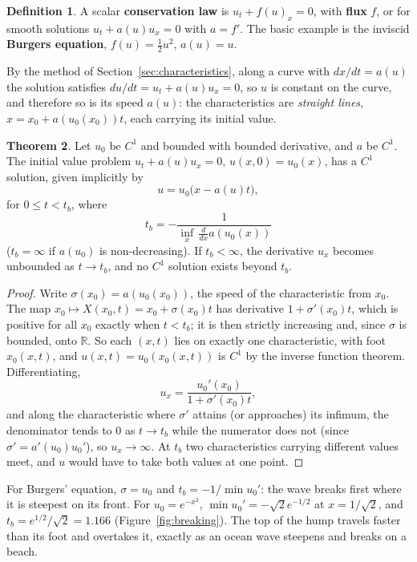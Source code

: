 \documentclass[11pt,a4paper]{article}
\numberwithin{equation}{section}
\theoremstyle{definition}
\newtheorem{thm}{Theorem}[subsection]
\newtheorem{defn}[thm]{Definition}
\begin{document}
\begin{defn}
A scalar \textbf{conservation law} is $u_t + f(u)_x = 0$, with \textbf{flux} $f$, or for smooth solutions $u_t + a(u)u_x = 0$ with $a = f'$. The basic example is the inviscid \textbf{Burgers equation},
$f(u) = \frac12u^2$, $a(u) = u$.
\end{defn}

By the method of Section~\ref{sec:characteristics}, along a curve with $dx/dt = a(u)$ the solution satisfies $du/dt = u_t + a(u)u_x = 0$, so $u$ is constant on the curve, and therefore so is its speed $a(u)$: the
characteristics are \emph{straight lines}, $x = x_0 + a(u_0(x_0))t$, each carrying its initial value.

\begin{thm}
\label{thm:breaking}
Let $u_0$ be $C^1$ and bounded with bounded derivative, and $a$ be $C^1$. The initial value problem $u_t + a(u)u_x = 0$, $u(x, 0) = u_0(x)$, has a $C^1$ solution, given implicitly by
\[
u = u_0\bigl(x - a(u)t\bigr),
\]
for $0 \leq t < t_b$, where
\[
t_b = -\frac{1}{\inf_x\,\frac{d}{dx}a(u_0(x))}
\]
($t_b = \infty$ if $a(u_0)$ is non-decreasing). If $t_b < \infty$, the derivative $u_x$ becomes unbounded as $t \to t_b$, and no $C^1$ solution exists beyond $t_b$.
\end{thm}

\begin{proof}
Write $\sigma(x_0) = a(u_0(x_0))$, the speed of the characteristic from $x_0$. The map $x_0 \mapsto X(x_0, t) = x_0 + \sigma(x_0)t$ has derivative $1 + \sigma'(x_0)t$, which is positive for all $x_0$ exactly when $t < t_b$; it is then
strictly increasing and, since $\sigma$ is bounded, onto $\mathbb R$. So each $(x, t)$ lies on exactly one characteristic, with foot $x_0(x, t)$, and $u(x, t) = u_0(x_0(x, t))$ is $C^1$ by the inverse function theorem. Differentiating,
\[
u_x = \frac{u_0'(x_0)}{1 + \sigma'(x_0)t} ,
\]
and along the characteristic where $\sigma'$ attains (or approaches) its infimum, the denominator tends to $0$ as $t \to t_b$ while the numerator does not (since $\sigma' = a'(u_0)u_0'$), so $u_x \to \infty$. At $t_b$ two
characteristics carrying different values meet, and $u$ would have to take both values at one point.
\end{proof}

For Burgers' equation, $\sigma = u_0$ and $t_b = -1/\min u_0'$: the wave breaks first where it is steepest on its front. For $u_0 = e^{-x^2}$, $\min u_0' = -\sqrt2e^{-1/2}$ at $x = 1/\sqrt2$, and $t_b = e^{1/2}/\sqrt2 = 1.166$
(Figure~\ref{fig:breaking}). The top of the hump travels faster than its foot and overtakes it, exactly as an ocean wave steepens and breaks on a beach.
\end{document}
